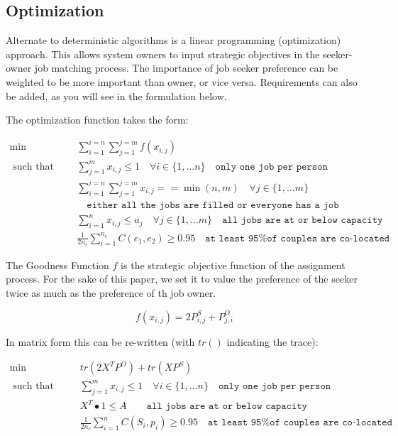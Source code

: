 \subsection{Optimization}

Alternate to deterministic algorithms is a linear programming (optimization) approach. This allows system owners to input strategic objectives in the seeker-owner job matching process. The importance of job seeker preference can be weighted to be more important than owner, or vice versa. Requirements can also be added, as you will see in the formulation below.

The optimization function takes the form:

\begin{align}
\min \qquad & \sum_{i = 1}^{i=n} \sum_{j = 1}^{j=m} f(x_{i,j}) \\
\text{ such that } \qquad & \sum_{j=1}^m x_{i,j} \leq 1 \quad  \forall i \in \{1, \dots n\} \quad \texttt{only one job per person} \\
& \sum_{i = 1}^{i=n} \sum_{j = 1}^{j=m}x_{i,j} == \min(n,m) \quad  \forall j \in \{1, \dots m\} \\& \quad \texttt{either all the jobs are filled or everyone has a job} \\
& \sum_{i=1}^n x_{i,j} \leq a_j \quad  \forall j \in \{1, \dots m\} \quad \texttt{all jobs are at or below capacity} \\
& \frac{1}{2n_c} \sum_{i=1}^{n_e} C(e_1, e_2) \geq 0.95 \quad \texttt{at least 95\% of couples are co-located}
\end{align}

The Goodness Function $f$ is the strategic objective function of the assignment process. For the sake of this paper, we set it to value the preference of the seeker twice as much as the preference of th job owner.

\[f(x_{i,j}) = 2P^S_{i,j} + P^O_{j,i}\]

In matrix form this can be re-written (with $tr()$ indicating the trace):

\begin{align}
\min \qquad & tr(2X^TP^O) + tr(XP^S) \\
\text{ such that } \qquad & \sum_{j=1}^m x_{i,j} \leq 1 \quad  \forall i \in \{1, \dots n\} \quad \texttt{only one job per person} \\
& X^T \bullet 1 \leq A \quad \quad \texttt{all jobs are at or below capacity} \\
& \frac{1}{2n_c} \sum_{i=1}^n C(S_i, p_i) \geq 0.95 \quad \texttt{at least 95\% of couples are co-located}
\end{align}


